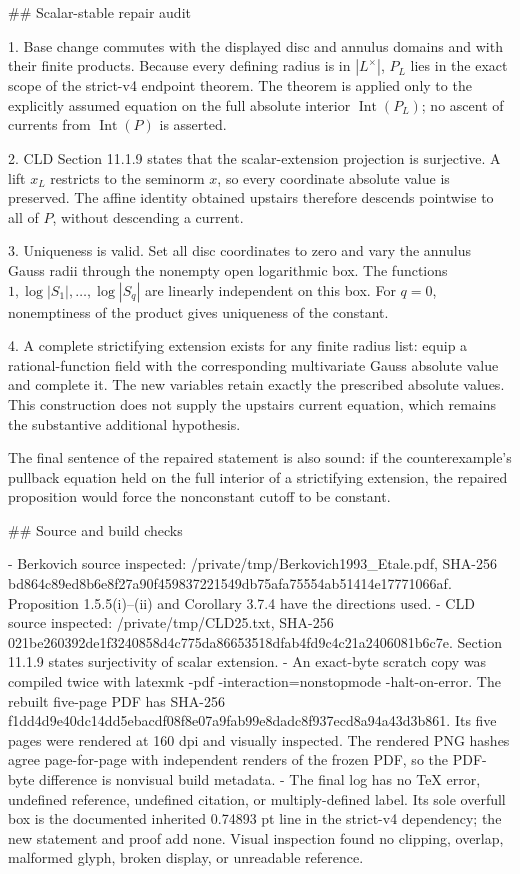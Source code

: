 ## Scalar-stable repair audit

1. Base change commutes with the displayed disc and annulus domains and
   with their finite products. Because every defining radius is in
   \(|L^\times|\), \(P_L\) lies in the exact scope of the strict-v4 endpoint
   theorem. The theorem is applied only to the explicitly assumed equation
   on the full absolute interior \(\operatorname{Int}(P_L)\); no ascent of
   currents from \(\operatorname{Int}(P)\) is asserted.

2. CLD Section 11.1.9 states that the scalar-extension projection is
   surjective. A lift \(x_L\) restricts to the seminorm \(x\), so every
   coordinate absolute value is preserved. The affine identity obtained
   upstairs therefore descends pointwise to all of \(P\), without
   descending a current.

3. Uniqueness is valid. Set all disc coordinates to zero and vary the
   annulus Gauss radii through the nonempty open logarithmic box. The
   functions \(1,\log|S_1|,\ldots,\log|S_q|\) are linearly independent on
   this box. For \(q=0\), nonemptiness of the product gives uniqueness of
   the constant.

4. A complete strictifying extension exists for any finite radius list:
   equip a rational-function field with the corresponding multivariate
   Gauss absolute value and complete it. The new variables retain exactly
   the prescribed absolute values. This construction does not supply the
   upstairs current equation, which remains the substantive additional
   hypothesis.

The final sentence of the repaired statement is also sound: if the
counterexample's pullback equation held on the full interior of a
strictifying extension, the repaired proposition would force the
nonconstant cutoff to be constant.

## Source and build checks

- Berkovich source inspected:
  /private/tmp/Berkovich1993_Etale.pdf, SHA-256
  bd864c89ed8b6e8f27a90f459837221549db75afa75554ab51414e17771066af.
  Proposition 1.5.5(i)--(ii) and Corollary 3.7.4 have the directions used.
- CLD source inspected: /private/tmp/CLD25.txt, SHA-256
  021be260392de1f3240858d4c775da86653518dfab4fd9c4c21a2406081b6c7e.
  Section 11.1.9 states surjectivity of scalar extension.
- An exact-byte scratch copy was compiled twice with
  latexmk -pdf -interaction=nonstopmode -halt-on-error. The rebuilt
  five-page PDF has SHA-256
  f1dd4d9e40dc14dd5ebacdf08f8e07a9fab99e8dadc8f937ecd8a94a43d3b861.
  Its five pages were rendered at 160 dpi and visually inspected. The
  rendered PNG hashes agree page-for-page with independent renders of the
  frozen PDF, so the PDF-byte difference is nonvisual build metadata.
- The final log has no TeX error, undefined reference, undefined citation,
  or multiply-defined label. Its sole overfull box is the documented
  inherited 0.74893 pt line in the strict-v4 dependency; the new statement
  and proof add none. Visual inspection found no clipping, overlap,
  malformed glyph, broken display, or unreadable reference.

